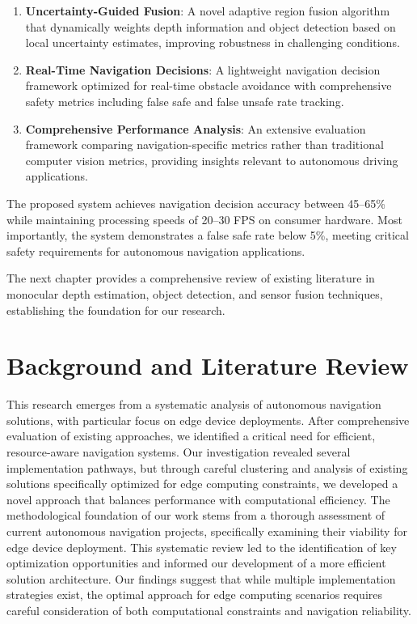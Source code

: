 \documentclass[12pt,oneside]{book}
\begin{document}
\begin{enumerate}
\item \textbf{Uncertainty-Guided Fusion}: A novel adaptive region fusion algorithm that dynamically weights depth information and object detection based on local uncertainty estimates, improving robustness in challenging conditions.

\item \textbf{Real-Time Navigation Decisions}: A lightweight navigation decision framework optimized for real-time obstacle avoidance with comprehensive safety metrics including false safe and false unsafe rate tracking.

\item \textbf{Comprehensive Performance Analysis}: An extensive evaluation framework comparing navigation-specific metrics rather than traditional computer vision metrics, providing insights relevant to autonomous driving applications.
\end{enumerate}
\vspace{3cm}The proposed system achieves navigation decision accuracy between 45--65\% while maintaining processing speeds of 20--30 FPS on consumer hardware. Most importantly, the system demonstrates a false safe rate below 5\%, meeting critical safety requirements for autonomous navigation applications.

\vspace{12pt}
The next chapter provides a comprehensive review of existing literature in monocular depth estimation, object detection, and sensor fusion techniques, establishing the foundation for our research.

\chapter{Background and Literature Review}
This research emerges from a systematic analysis of autonomous navigation solutions, with particular focus on edge device deployments. After comprehensive evaluation of existing approaches, we identified a critical need for efficient, resource-aware navigation systems. Our investigation revealed several implementation pathways, but through careful clustering and analysis of existing solutions specifically optimized for edge computing constraints, we developed a novel approach that balances performance with computational efficiency.
The methodological foundation of our work stems from a thorough assessment of current autonomous navigation projects, specifically examining their viability for edge device deployment. This systematic review led to the identification of key optimization opportunities and informed our development of a more efficient solution architecture. Our findings suggest that while multiple implementation strategies exist, the optimal approach for edge computing scenarios requires careful consideration of both computational constraints and navigation reliability.
\end{document}

